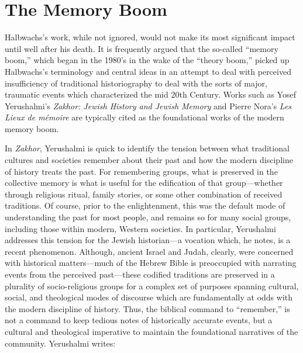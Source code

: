 \hypertarget{the-memory-boom}{%
\section{The Memory Boom}\label{the-memory-boom}}

Halbwachs's work, while not ignored, would not make its most significant
impact until well after his death. It is frequently argued that the
so-called ``memory boom,'' which began in the 1980's in the wake of the
``theory boom,'' picked up Halbwachs's terminology and central ideas in
an attempt to deal with perceived insufficiency of traditional
historiography to deal with the sorts of major, traumatic events which
characterized the mid 20th
Century.\autocites[1--2]{galinsky_galinsky2016}[See also][29--36. One
cannot help but speculate that---at least in the English-speaking
world---the translation of \emph{The Collective Memory} in 1980
contributed to the popularity of Halbwachs's
terminology.]{olick_olick-etal2011} Works such as Yosef Yerushalmi's
\emph{Zakhor: Jewish History and Jewish Memory} and Pierre Nora's
\emph{Les Lieux de mémoire} are typically cited as the foundational
works of the modern memory
boom.\autocites[112--113]{klein2011}{yerushalmi1989}[Nora's massive
project has been abridged and translated into English as][]{nora1996}

In \emph{Zakhor}, Yerushalmi is quick to identify the tension between
what traditional cultures and societies remember about their past and
how the modern discipline of history treats the past. For remembering
groups, what is preserved in the collective memory is what is useful for
the edification of that group---whether through religious ritual, family
stories, or some other combination of received traditions. Of course,
prior to the enlightenment, this was the default mode of understanding
the past for most people, and remains so for many social groups,
including those within modern, Western societies. In particular,
Yerushalmi addresses this tension for the Jewish historian---a vocation
which, he notes, is a recent phenomenon. Although, ancient Israel and
Judah, clearly, were concerned with historical matters---much of the
Hebrew Bible is preoccupied with narrating events from the perceived
past---these codified traditions are preserved in a plurality of
socio-religious groups for a complex set of purposes spanning cultural,
social, and theological modes of discourse which are fundamentally at
odds with the modern discipline of history. Thus, the biblical command
to ``remember,'' is not a command to keep tedious notes of historically
accurate events, but a cultural and theological imperative to maintain
the foundational narratives of the community. Yerushalmi writes:

